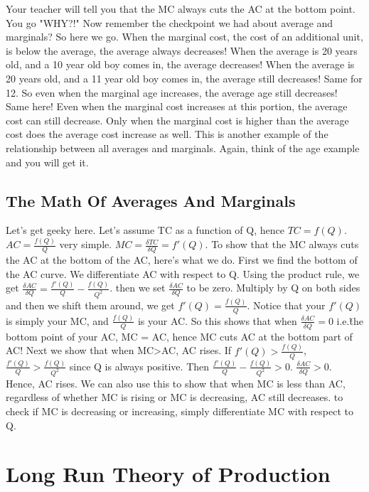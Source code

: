 Your teacher will tell you that the MC always cuts the AC at the bottom point. You go "WHY?!" Now remember the checkpoint we had about average and marginals? So here we go. When the marginal cost, the cost of an additional unit, is below the average, the average always decreases! When the average is 20 years old, and a 10 year old boy comes in, the average decreases! When the average is 20 years old, and a 11 year old boy comes in, the average still decreases! Same for 12. So even when the marginal age increases, the average age still decreases! Same here! Even when the marginal cost increases at this portion, the average cost can still decrease. Only when the marginal cost is higher than the average cost does the average cost increase as well. This is another example of the relationship between all averages and marginals. Again, think of the age example and you will get it.
\subsection{The Math Of Averages And Marginals}
Let's get geeky here. Let's assume TC as a function of Q, hence $TC = f(Q)$. $AC = \frac{f(Q)}{Q}$ very simple. $MC = \frac{\delta TC}{\delta Q} = f\prime(Q)$. To show that the MC always cuts the AC at the bottom of the AC, here's what we do. First we find the bottom of the AC curve. We differentiate AC with respect to Q. Using the product rule, we get $\frac{\delta AC}{\delta Q} = \frac{f\prime(Q)}{Q} - \frac{f(Q)}{Q^2}$. then we set $\frac{\delta AC}{\delta Q}$ to be zero. Multiply by Q on both sides and then we shift them around, we get $f\prime(Q) = \frac{f(Q)}{Q}$. Notice that your $f\prime(Q)$ is simply your MC, and $\frac{f(Q)}{Q}$ is your AC. So this shows that when $\frac{\delta AC}{\delta Q} = 0$ i.e.\~the bottom point of your AC, MC = AC, hence MC cuts AC at the bottom part of AC! Next we show that when MC>AC, AC rises. If $f\prime(Q) > \frac{f(Q)}{Q}$, $\frac{f\prime(Q)}{Q} > \frac{f(Q)}{Q^2}$ since Q is always positive. Then $\frac{f\prime(Q)}{Q} - \frac{f(Q)}{Q^2}> 0$. $\frac{\delta AC}{\delta Q} > 0$. Hence, AC rises. We can also use this to show that when MC is less than AC, regardless of whether MC is rising or MC is decreasing, AC still decreases. to check if MC is decreasing or increasing, simply differentiate MC with respect to Q. 
\section{Long Run Theory of Production}

